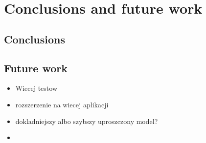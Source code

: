 \chapter{Conclusions and future work}
\label{chap:conclusions} 

\section{Conclusions}


\section{Future work}

\todo{!!}

\begin{itemize}
  \item Wiecej testow
  \item rozszerzenie na wiecej aplikacji
  \item dokladniejszy albo szybszy uproszczony model?
  \item 
\end{itemize}